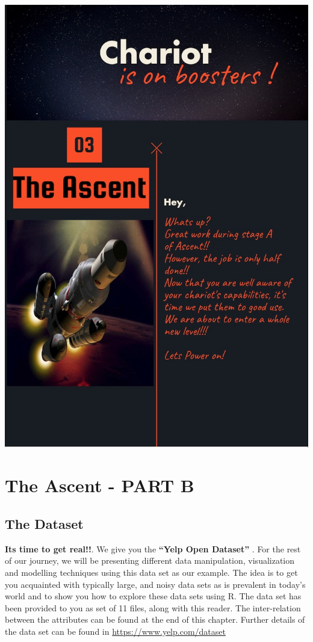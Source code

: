 \documentclass[12pt]{book}\usepackage{knitr}
\begin{document}
\cleardoublepage
\thispagestyle{empty}
\includegraphics[width = 16 cm]{./viz/ext/Ascent_B.jpeg}

\chapter{The Ascent - PART B}



\section{The Dataset}
\textbf{Its time to get real!!}. We give you the \textbf{``Yelp Open Dataset''} . 
For the rest of our journey, we will be presenting different data manipulation, visualization and modelling techniques using this data set as our example. The idea is to get you acquainted with  typically large, and noisy data sets as is prevalent in today's world and to show you how to explore these data sets using R. The data set has been provided to you as set of 11 files, along with this reader. The inter-relation between the attributes can be found at the end of this chapter. Further details of the data set can be found in \textcolor{cyan}{\url{https://www.yelp.com/dataset}} 
\end{document}
